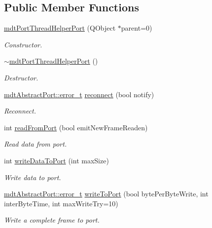 \subsection*{Public Member Functions}
\begin{DoxyCompactItemize}
\item 
\hyperlink{classmdt_port_thread_helper_port_ab037d6f41e9f19145f06a964701181a3}{mdt\-Port\-Thread\-Helper\-Port} (Q\-Object $\ast$parent=0)
\begin{DoxyCompactList}\small\item\em Constructor. \end{DoxyCompactList}\item 
\hyperlink{classmdt_port_thread_helper_port_afd9117d9a6b4f6769fc3ab0c9fa4a1e8}{$\sim$mdt\-Port\-Thread\-Helper\-Port} ()
\begin{DoxyCompactList}\small\item\em Destructor. \end{DoxyCompactList}\item 
\hyperlink{classmdt_abstract_port_ad4121bb930c95887e77f8bafa065a85e}{mdt\-Abstract\-Port\-::error\-\_\-t} \hyperlink{classmdt_port_thread_helper_port_a0404d78ce7372c4732e48197d4e88e3c}{reconnect} (bool notify)
\begin{DoxyCompactList}\small\item\em Reconnect. \end{DoxyCompactList}\item 
int \hyperlink{classmdt_port_thread_helper_port_a9b908f7675a9f5ab28f306bba282f68f}{read\-From\-Port} (bool emit\-New\-Frame\-Readen)
\begin{DoxyCompactList}\small\item\em Read data from port. \end{DoxyCompactList}\item 
int \hyperlink{classmdt_port_thread_helper_port_a1d5cda8a61575825c3acd8b72f00fc6f}{write\-Data\-To\-Port} (int max\-Size)
\begin{DoxyCompactList}\small\item\em Write data to port. \end{DoxyCompactList}\item 
\hyperlink{classmdt_abstract_port_ad4121bb930c95887e77f8bafa065a85e}{mdt\-Abstract\-Port\-::error\-\_\-t} \hyperlink{classmdt_port_thread_helper_port_a25c35855dc9e8edc489a9efad8d293f7}{write\-To\-Port} (bool byte\-Per\-Byte\-Write, int inter\-Byte\-Time, int max\-Write\-Try=10)
\begin{DoxyCompactList}\small\item\em Write a complete frame to port. \end{DoxyCompactList}\end{DoxyCompactItemize}
